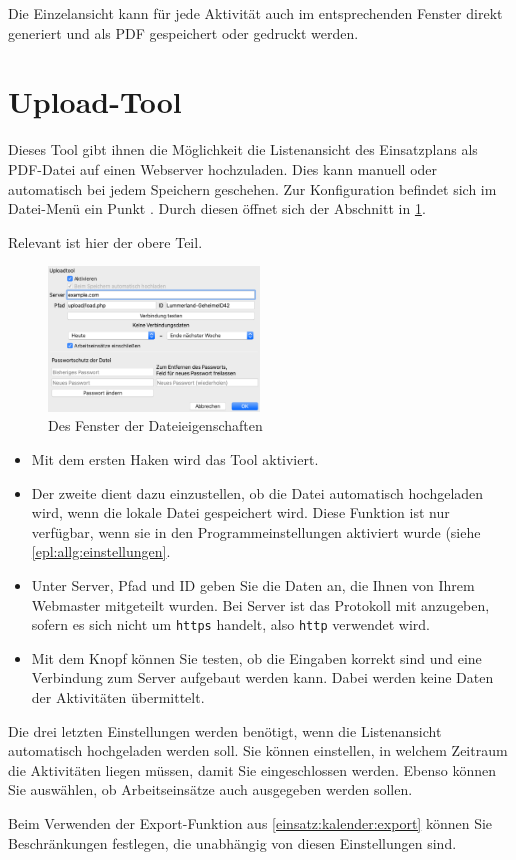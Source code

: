 Die Einzelansicht kann für jede Aktivität auch im entsprechenden Fenster direkt generiert und als PDF gespeichert oder gedruckt werden.




\section{Upload-Tool}\label{einsatz:kalender:upload}
Dieses Tool gibt ihnen die Möglichkeit die Listenansicht des Einsatzplans als PDF-Datei auf einen Webserver hochzuladen.
Dies kann manuell oder automatisch bei jedem Speichern geschehen.
Zur Konfiguration befindet sich im Datei-Menü ein Punkt .
Durch diesen öffnet sich der Abschnitt in \cref{fig:einsatz:kalender:upload}.
\begin{neu}
Relevant ist hier der obere Teil.
\end{neu}
\begin{figure}[!h]
  \centering
	\includegraphics[width=0.5\textwidth]{img/eigenschaften}
	\caption{Des Fenster der Dateieigenschaften}
	\label{fig:einsatz:kalender:upload}
\end{figure}
\begin{itemize}
  \item
  Mit dem ersten Haken wird das Tool aktiviert.
  \item
  Der zweite dient dazu einzustellen, ob die Datei automatisch hochgeladen wird, wenn die lokale Datei gespeichert wird.
  Diese Funktion ist nur verfügbar, wenn sie in den Programmeinstellungen aktiviert wurde (siehe \cref{epl:allg:einstellungen}.
  \item
  Unter Server, Pfad und ID geben Sie die Daten an, die Ihnen von Ihrem Webmaster mitgeteilt wurden.
  Bei Server ist das Protokoll mit anzugeben, sofern es sich nicht um \texttt{https} handelt, also \texttt{http} verwendet wird.
  \item
  Mit dem Knopf können Sie testen, ob die Eingaben korrekt sind und eine Verbindung zum Server aufgebaut werden kann.
  Dabei werden keine Daten der Aktivitäten übermittelt.
\end{itemize}
Die drei letzten Einstellungen werden benötigt, wenn die Listenansicht automatisch hochgeladen werden soll.
Sie können einstellen, in welchem Zeitraum die Aktivitäten liegen müssen, damit Sie eingeschlossen werden.
Ebenso können Sie auswählen, ob Arbeitseinsätze auch ausgegeben werden sollen.

\begin{hinweis}
  Beim Verwenden der Export-Funktion aus \cref{einsatz:kalender:export} können Sie Beschränkungen festlegen, die unabhängig von diesen Einstellungen sind.
\end{hinweis}
